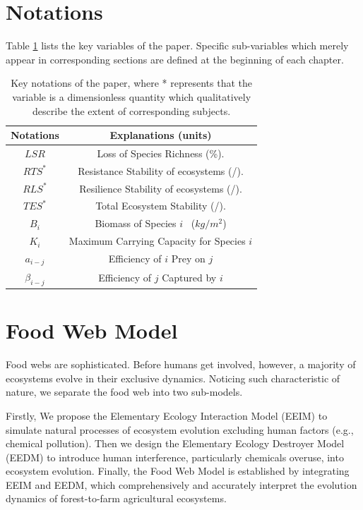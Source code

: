 \documentclass[12pt]{article}
\begin{document}
	\section{Notations}
	\hspace{1.5em}Table \ref{notations} lists the key variables of the paper. Specific sub-variables which merely appear in corresponding sections are defined at the beginning of each chapter.  
	\begin{table}[h]
		\centering
		\setlength{\tabcolsep}{45pt}
		\begin{tabular}{cc}
			\toprule[2pt]
			\textbf{Notations} & \textbf{Explanations (units)} \\
			\midrule[1pt]
			$LSR$ & Loss of Species Richness (\%).\\
			$RTS^{*}$ & Resistance Stability of ecosystems (/).\\
			$RLS^{*}$ & Resilience Stability of ecosystems (/).\\
			$TES^{*}$ & Total Ecosystem Stability (/). \\
			$B_i$ & Biomass of Species $i$ \ ($kg/m^2$) \\
			$K_i$ & Maximum Carrying Capacity for Species $i$\\
			$a_{i-j}$ & Efficiency of $i$ Prey on $j$\\
			$\beta_{i-j}$ & Efficiency of $j$ Captured by $i$\\
			\bottomrule[2pt]
		\end{tabular}
		\caption{Key notations of the paper, where * represents that the variable is a dimensionless quantity which qualitatively describe the extent of corresponding subjects.}
		\label{notations}
	\end{table}
	
	
	\section{Food Web Model}
	\hspace{2em}Food webs are sophisticated. Before humans get involved, however, a majority of ecosystems evolve in their exclusive dynamics. Noticing such characteristic of nature, we separate the food web into two sub-models. 
	
	Firstly, We propose the Elementary Ecology Interaction Model (EEIM) to simulate natural processes of ecosystem evolution excluding human factors (e.g., chemical pollution). Then we design the Elementary Ecology Destroyer Model (EEDM) to introduce human interference, particularly chemicals overuse, into ecosystem evolution. Finally, the Food Web Model is established by integrating EEIM and EEDM, which comprehensively and accurately interpret the evolution dynamics of forest-to-farm agricultural ecosystems.
\end{document}
